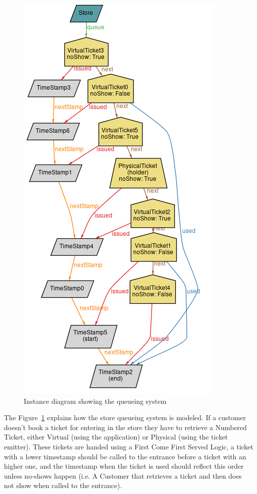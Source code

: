 \begin{figure}[H]
    \hspace*{2.8cm}
    \includegraphics[]{Images/alloy_2_queue.png}
    \caption{\label{fig:Alloy_3}Instance diagram showing the queueing system}
\end{figure}

The Figure~\ref{fig:Alloy_3} explains how the store queueing system is modeled. If a customer doesn't book a ticket for entering in the store they have to retrieve a Numbered Ticket, either Virtual (using the application) or Physical (using the ticket emitter). These tickets are handed using a First Come First Served Logic, a ticket with a lower timestamp should be called to the entrance before a ticket with an higher one, and the timestamp when the ticket is used should reflect this order unless no-shows happen (i.e. A Customer that retrieves a ticket and then does not show when called to the entrance).